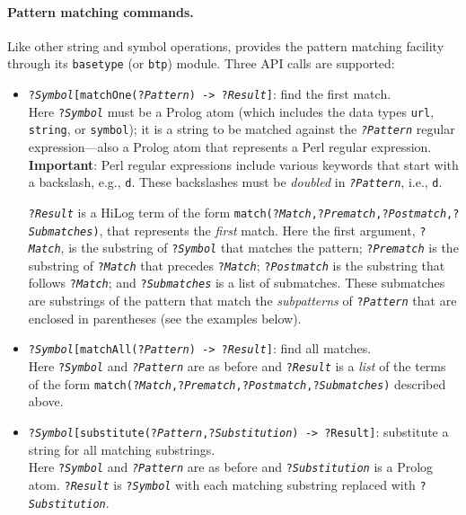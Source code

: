 \paragraph{Pattern matching commands.}
Like other string and symbol operations, \ERGO provides the pattern matching
facility through its \texttt{\bs{}basetype}  (or \texttt{\bs{}btp}) module.
Three API calls are supported:
\begin{itemize}
\item  \texttt{?\emph{Symbol}[matchOne(?\emph{Pattern}) -> ?\emph{Result}]}:
  find the first match.\\
  Here
  \texttt{?\emph{Symbol}} must be a Prolog atom (which includes the data
  types \texttt{\bs{}url}, \texttt{\bs{}string}, or \texttt{\bs{}symbol});
  it is a string to be matched against the \texttt{\emph{?Pattern}} regular
  expression---also a Prolog atom that represents a Perl regular
  expression. \textbf{Important}: Perl regular expressions include various
  keywords that start with a backslash, e.g., \texttt{\bs{}d}. These
  backslashes must be \emph{doubled} in \texttt{\emph{?Pattern}}, i.e.,
  \texttt{\bs{}\bs{}d}.  

  \texttt{?\emph{Result}} is a HiLog term of the form
  \texttt{match(?\emph{Match},?\emph{Prematch},?\emph{Postmatch},?\emph{Submatches})},
  that represents the \emph{first} match.
  Here the first argument, \texttt{?\emph{Match}}, is the substring of
  \texttt{?\emph{Symbol}} that matches the pattern;
  \texttt{?\emph{Prematch}} is the substring of \texttt{?\emph{Match}}
  that precedes
  \texttt{?\emph{Match}};   \texttt{?\emph{Postmatch}} is the substring
  that follows \texttt{?\emph{Match}}; and \texttt{?\emph{Submatches}} is a
  list of submatches. These submatches are substrings of the pattern that match
  the \emph{subpatterns} of \texttt{?\emph{Pattern}} that are enclosed in
  parentheses (see the examples below).
\item \texttt{?\emph{Symbol}[matchAll(?\emph{Pattern}) -> ?\emph{Result}]}: 
  find all matches.\\
  Here
  \texttt{?\emph{Symbol}} and \texttt{\emph{?Pattern}} are as before and
  \texttt{?\emph{Result}} is a \emph{list} of the terms
  of the form
  \texttt{match(?\emph{Match},?\emph{Prematch},?\emph{Postmatch},?\emph{Submatches})}
  described above.
\item \texttt{?\emph{Symbol}[substitute(?\emph{Pattern},?\emph{Substitution}) -> ?Result]}:
  substitute a string for all matching substrings.
  \\
  Here \texttt{?\emph{Symbol}}
  and \texttt{\emph{?Pattern}} are as before and
  \texttt{?\emph{Substitution}} is a Prolog atom. \texttt{?\emph{Result}}
  is \texttt{?\emph{Symbol}} with each matching substring replaced
  with \texttt{?\emph{Substitution}}.
\end{itemize}
